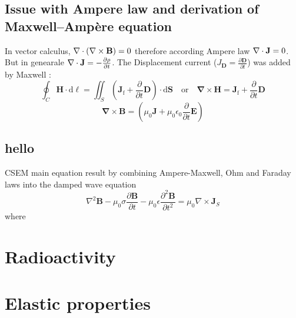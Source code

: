 \documentclass[twocolumn]{article}
\begin{document}
\subsection{Issue with Ampere law and derivation of Maxwell–Ampère equation}
In vector calculus, $\nabla\cdot(\nabla\times\bold{B}) = 0 $ therefore according Ampere law $\nabla\cdot \bold{J} = 0$. But in genearale $\nabla\cdot \bold{J} = -\frac{\partial \rho}{\partial t} $. The Displacement current ($J_\mathbf{D}=\frac{\partial \mathbf{D}}{ \partial t}$) was added by Maxwell :
\[ \oint_C \mathbf{H} \cdot \mathrm{d}\boldsymbol{\ell} =  \iint_S \left( \mathbf{J}_{\mathrm{f}} + \frac{\partial }{\partial t}\mathbf{D} \right) \cdot \mathrm{d} \mathbf{S}    \quad \text{or} \quad \mathbf{\nabla} \times \mathbf{H} = \mathbf{J}_{\mathrm{f}}+\frac{\partial }{\partial t}\mathbf{D} \]
\[\mathbf{\nabla}\times \mathbf{B} = \left(\mu_0\mathbf{J}+\mu_0 \epsilon_0 \frac{\partial }{\partial t}\mathbf{E}\right) \]

\subsection{hello}
CSEM main equation result by combining Ampere-Maxwell, Ohm and Faraday laws into the damped wave equation
\[ \nabla ^2 \mathbf{B}  - \mu_0 \sigma \frac{\partial \mathbf{B}}{\partial t} - \mu_0 \epsilon \frac{\partial^2 \mathbf{B}}{\partial t^2}  = \mu_0 \nabla \times \mathbf{J}_S\] 
where






\section{Radioactivity}





\section{Elastic properties}











\end{document}

